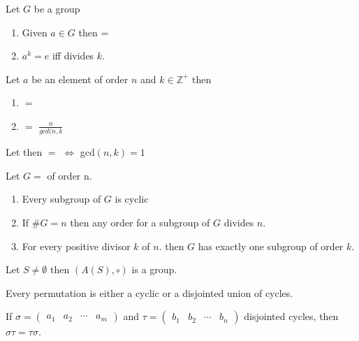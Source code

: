 \begin{assignment}[
  header=HeaderA,
  body=BodyA,
  title={Proved Theorems in  Group Theory},
  duedate={\today},
  toc=false,
  toctitle={This appears on the Table of contents.},
  exlist=false
]
\begin{mcorollary}[9][][cor:9]
Let $G$ be a group
\begin{enumerate}
    \item[i] Given $a \in G$ then  = 
    \item[ii] $a^k = e$ iff  divides $k$.
\end{enumerate}
\end{mcorollary}

\begin{mtheorem}[ 10][][thm:10]
Let $a$ be an element of order $n$ and $k \in \mathbb{Z}^+$ then 
\begin{enumerate}
    \item[i]  $=$ 
    \item[ii]  $=$ $\frac{n}{gcd(n,k}$
\end{enumerate}
\end{mtheorem}

\begin{mcorollary}[10][][cor:10]
Let  then  $=$  $\iff$ gcd$(n,k) = 1$ 
\end{mcorollary}

\begin{mtheorem}
Let $G =$ of order n.
\begin{enumerate}
    \item[i] Every subgroup of $G$ is cyclic
    \item[ii] If $\#G = n$ then any order for a subgroup of $G$ divides $n$.
    \item[iii] For every positive divisor $k$ of $n$. then $G$ has exactly one subgroup of order $k$.
\end{enumerate}
\end{mtheorem}

\begin{mtheorem}[12][][thm:12]
Let $S \neq \emptyset$ then $(A(S), \circ)$ is a group.
\end{mtheorem}

\begin{mtheorem}[14][][thm:14]
Every permutation is either a cyclic or a disjointed union of cycles.
\end{mtheorem}

\begin{mtheorem}[15][][thm:15]
If $\sigma = \begin{pmatrix} a_1 & a_2 & \cdots & a_m \end{pmatrix}$ and $\tau = \begin{pmatrix} b_1 & b_2 & \cdots & b_n \end{pmatrix}$ disjointed cycles, then $\sigma\tau = \tau\sigma$.
\end{mtheorem}


\end{assignment}
